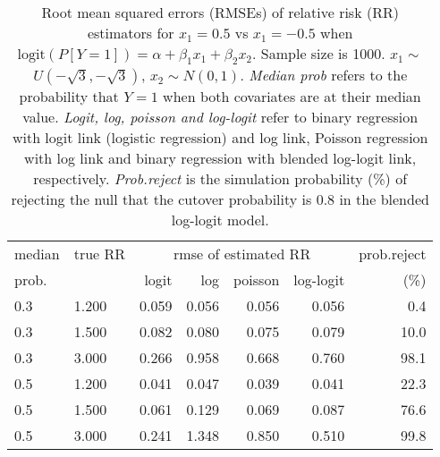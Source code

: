 \documentclass[12pt,a4paper]{article}
\begin{document}
\begin{table}[H] 
\small\sf\centering 
\caption{Root mean squared errors (RMSEs) of relative risk (RR) estimators for $x_1=0.5$ vs $x_1=-0.5$ when $\mbox{logit}(P[Y=1])=\alpha+\beta_1 x_1 + \beta_2 x_2$. Sample size is 1000. $x_1 \sim $$U(-\sqrt{3},-\sqrt{3})$, $x_2 \sim N(0,1)$. {\it Median prob} refers to the probability that $Y=1$ when both covariates are at their median value. {\it Logit, log, poisson and log-logit} refer to binary regression with logit link (logistic regression) and log link, Poisson regression with log link and binary regression with blended log-logit link, respectively. {\it Prob.reject} is the simulation probability (\%) of rejecting the null that the cutover probability is $0.8$ in the blended log-logit model.} 
\begin{tabular}{llrrrrr} 
\toprule 
median & true RR & \multicolumn{4}{c}{rmse of estimated RR} & prob.reject \\ 
prob. & & logit & log & poisson & log-logit  & (\%) \\ \midrule 
0.3 & 1.200 & 0.059 & 0.056 & 0.056 & 0.056 &  0.4 \\  
0.3 & 1.500 & 0.082 & 0.080 & 0.075 & 0.079 & 10.0 \\  
0.3 & 3.000 & 0.266 & 0.958 & 0.668 & 0.760 & 98.1 \\  
0.5 & 1.200 & 0.041 & 0.047 & 0.039 & 0.041 & 22.3 \\  
0.5 & 1.500 & 0.061 & 0.129 & 0.069 & 0.087 & 76.6 \\  
0.5 & 3.000 & 0.241 & 1.348 & 0.850 & 0.510 & 99.8 \\  
\bottomrule 
\end{tabular} 
\end{table} 
\end{document}
